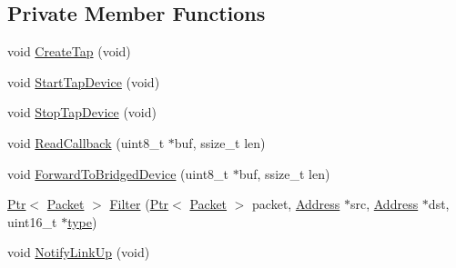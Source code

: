 \subsection*{Private Member Functions}
\begin{DoxyCompactItemize}
\item 
void \hyperlink{classns3_1_1TapBridge_ab8458214cc15eb045fa1048e36275432}{Create\+Tap} (void)
\item 
void \hyperlink{classns3_1_1TapBridge_a15e7ac0069167eb1e1d63b3cefe86002}{Start\+Tap\+Device} (void)
\item 
void \hyperlink{classns3_1_1TapBridge_a0daf7557c160441a6bf45b4915bc93c3}{Stop\+Tap\+Device} (void)
\item 
void \hyperlink{classns3_1_1TapBridge_a8cf7414db717096f2b3a2a0e7026ed8f}{Read\+Callback} (uint8\+\_\+t $\ast$buf, ssize\+\_\+t len)
\item 
void \hyperlink{classns3_1_1TapBridge_ab4390af3653278cc4ea265d3c7f4de15}{Forward\+To\+Bridged\+Device} (uint8\+\_\+t $\ast$buf, ssize\+\_\+t len)
\item 
\hyperlink{classns3_1_1Ptr}{Ptr}$<$ \hyperlink{classns3_1_1Packet}{Packet} $>$ \hyperlink{classns3_1_1TapBridge_aa141455ff96593217dcffd47d7bc48d0}{Filter} (\hyperlink{classns3_1_1Ptr}{Ptr}$<$ \hyperlink{classns3_1_1Packet}{Packet} $>$ packet, \hyperlink{classns3_1_1Address}{Address} $\ast$src, \hyperlink{classns3_1_1Address}{Address} $\ast$dst, uint16\+\_\+t $\ast$\hyperlink{visualizer-ideas_8txt_add98db9e15e2a58cf2b57623e7aa893a}{type})
\item 
void \hyperlink{classns3_1_1TapBridge_a845a502163a985d26b2b70c36493d945}{Notify\+Link\+Up} (void)
\end{DoxyCompactItemize}
